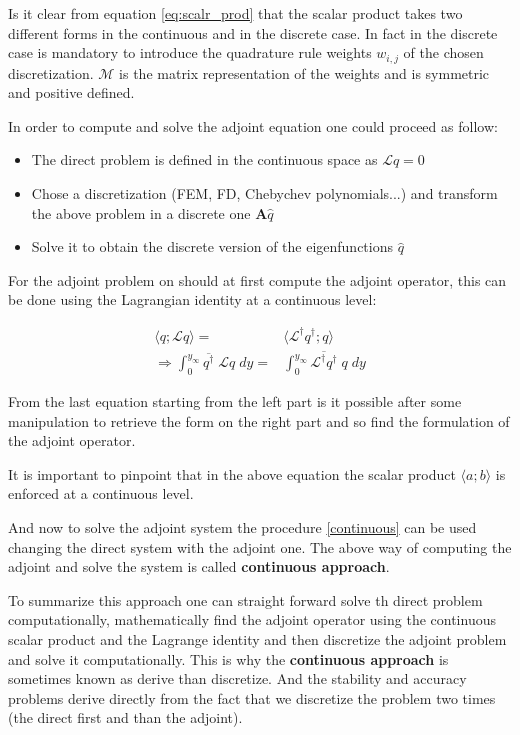 Is it clear from equation \ref{eq:scalr_prod} that the scalar product takes two different forms in the continuous and in the discrete case.
In fact in the discrete case is mandatory to introduce the quadrature rule weights $w_{i,j}$ of the chosen discretization.
$\mathcal{M}$ is the matrix representation of the weights and is symmetric and positive defined.

In order to compute and solve the adjoint equation one could proceed as follow:

\begin{itemize}
	\item The direct problem is defined in the continuous space as $\mathcal{L} q = 0$
	\item Chose a discretization (FEM, FD, Chebychev polynomials...) and transform the above problem in a discrete one $\mathbf{A} \hat{q}$
	\item Solve it to obtain the discrete version of the eigenfunctions $\hat{q}$
	\label{continuous}
\end{itemize}

For the adjoint problem on should at first compute the adjoint operator, this can be done using the Lagrangian identity at a continuous level:

\begin{equation}
\begin{split}
\langle q; \mathcal{L} q \rangle =& \langle {\mathcal{L}}^{\dagger} q^{\dagger} ; q \rangle \\
\Rightarrow \int_{0}^{y_{\infty}} \overline{q^{\dagger}} \; \mathcal{L} q  \; dy =& \int_{0}^{y_{\infty}} \overline{ {\mathcal{L}}^{\dagger} q^{\dagger}}  \; q  \; dy 
\end{split}
\end{equation}

From the last equation starting from the left part is it possible after some manipulation to retrieve the form on the right part and so find the formulation of the adjoint operator.

It is important to pinpoint that in the above equation the  scalar product $ \langle a ; b\rangle$ is enforced at a continuous level.

And now to solve the adjoint system the procedure \ref{continuous} can be used changing the direct system with the adjoint one.
The above way of computing the adjoint and solve the system is called \textbf{continuous approach}.

To summarize this approach one can straight forward solve th direct problem computationally, mathematically find the adjoint operator using the continuous scalar product and the Lagrange identity and then discretize the adjoint problem and solve it computationally.
This is why the \textbf{continuous approach} is sometimes known as derive than discretize.
And the stability and accuracy problems derive directly from the fact that we discretize the problem two times (the direct first and than the adjoint).


